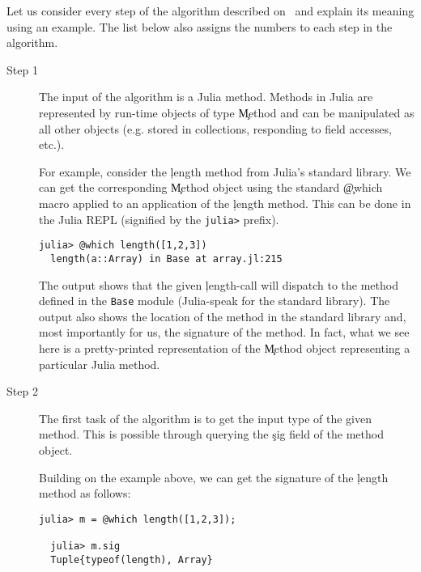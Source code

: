 

Let us consider every step of the algorithm described
on~ and explain its meaning using an example.
The list below also assigns the numbers to each step in the algorithm.
\begin{description}

  \item[Step 1] The input of the algorithm is a Julia method. Methods in Julia are
  represented by run-time objects of type \c{Method} and can be manipulated as
  all other objects (e.g. stored in collections, responding to field accesses, etc.).

  For example, consider the \c{length} method from Julia's standard library. We can
  get the corresponding \c{Method} object using the standard \c{@which} macro
  applied to an application of the \c{length} method. This can be done in the
  Julia REPL (signified by the \texttt{julia>} prefix).

\begin{minipage}{.92\textwidth}
\begin{lstlisting}[style=jterm]
  julia> @which length([1,2,3])
  length(a::Array) in Base at array.jl:215
\end{lstlisting}
\end{minipage}

  The output shows that the given \c{length}-call will dispatch to the
  method defined in the \texttt{Base} module (Julia-speak for the standard
  library). The output also shows the location of the method in the
  standard library and, most importantly for us, the signature of the
  method. In fact, what we see here is a pretty-printed representation of
  the \c{Method} object representing a particular Julia method.

  \item[Step 2] The first task of the algorithm is to get the input type of the given
  method. This is possible through querying the \c{sig} field of the method object.

  Building on the example above, we can get the signature of the \c{length}
  method as follows:

\begin{minipage}{.92\textwidth}
\begin{lstlisting}[style=jterm]
  julia> m = @which length([1,2,3]);

  julia> m.sig
  Tuple{typeof(length), Array}
\end{lstlisting}
\end{minipage}


\end{description}
